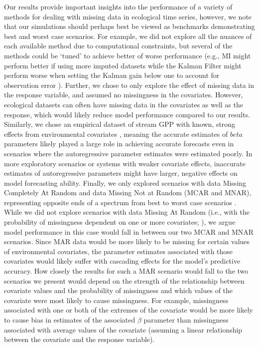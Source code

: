 \documentclass{article}
\begin{document}
Our results provide important insights into the performance of a variety of methods for dealing with missing data in ecological time series, however, we note that our simulations should perhaps best be viewed as benchmarks demonstrating best and worst case scenarios. For example, we did not explore all the nuances of each available method due to computational constraints, but several of the methods could be `tuned' to achieve better of worse performance (e.g., MI might perform better if using more imputed datasets \citep{honaker_what_2010} while the Kalman Filter might perform worse when setting the Kalman gain below one to account for observation error \citep{kalman_filter_1960}). Further, we chose to only explore the effect of missing data in the response variable, and assumed no missingness in the covariates. However, ecological datasets can often have missing data in the covariates as well as the response, which would likely reduce model performance compared to our results. Similarly, we chose an empirical dataset of stream GPP with known, strong effects from environmental covariates \citep{hall_turbidity_2015,bernhardt_metabolic_2018}, meaning the accurate estimates of $beta$ parameters likely played a large role in achieving accurate forecasts even in scenarios where the autoregressive parameter estimates were estimated poorly. In more exploratory scenarios or systems with weaker covariate effects, inaccurate estimates of autoregressive parameters might have larger, negative effects on model forecasting ability. Finally, we only explored scenarios with data Missing Completely At Random and data Missing Not at Random (MCAR and MNAR), representing opposite ends of a spectrum from best to worst case scenarios \citep{newman_missing_2014}. While we did not explore scenarios with data Missing At Random (i.e., with the probability of missingness dependent on one or more covariates; \citep{newman_missing_2014}), we argue model performance in this case would fall in between our two MCAR and MNAR scenarios. Since MAR data would be more likely to be missing for certain values of environmental covariates, the parameter estimates associated with those covariates would likely suffer \citep{nakagawa_missing_2008} with cascading effects for the model's predictive accuracy. How closely the results for such a MAR scenario would fall to the two scenarios we present would depend on the strength of the relationship between covariate values and the probability of missingness and which values of the covariate were most likely to cause missingness. For example, missingness associated with one or both of the extremes of the covariate would be more likely to cause bias in estimates of the associated $\beta$ parameter than missingness associated with average values of the covariate (assuming a linear relationship between the covariate and the response variable). 
\end{document}
